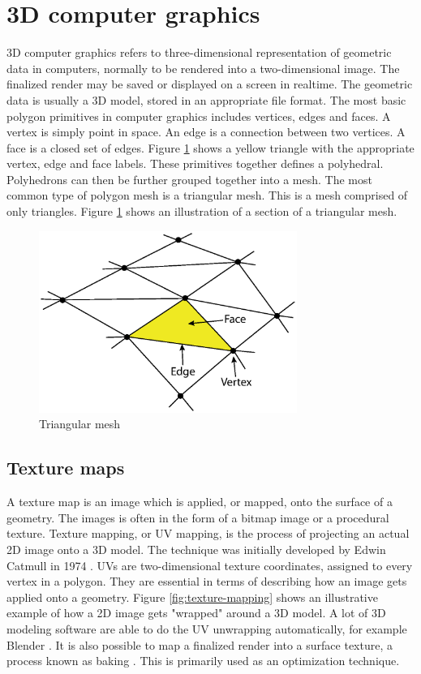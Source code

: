 \section{3D computer graphics}
3D computer graphics refers to three-dimensional representation of geometric data in computers, normally to be rendered into a two-dimensional image. The finalized render may be saved or displayed on a screen in realtime. The geometric data is usually a 3D model, stored in an appropriate file format. The most basic polygon primitives in computer graphics includes vertices, edges and faces. A vertex is simply point in space. An edge is a connection between two vertices. A face is a closed set of edges. Figure \ref{fig:triangular-mesh} shows a yellow triangle with the appropriate vertex, edge and face labels. These primitives together defines a polyhedral. Polyhedrons can then be further grouped together into a mesh. The most common type of polygon mesh is a triangular mesh. This is a mesh comprised of only triangles. Figure \ref{fig:triangular-mesh} shows an illustration of a section of a triangular mesh.
\begin{figure}[ht]
    \centering
    \includegraphics[width=0.75\textwidth]{sections/theory/figures/mesh.eps}
    \caption{Triangular mesh}
    \label{fig:triangular-mesh}
\end{figure}

\subsection{Texture maps}
\label{sec:info-texture-maps}
A texture map is an image which is applied, or mapped, onto the surface of a geometry. The images is often in the form of a bitmap image or a procedural texture. Texture mapping, or UV mapping, is the process of projecting an actual 2D image onto a 3D model. The technique was initially developed by Edwin Catmull in 1974 \cite{catmull-texture-mapping}. UVs are two-dimensional texture coordinates, assigned to every vertex in a polygon. They are essential in terms of describing how an image gets applied onto a geometry. Figure \ref{fig:texture-mapping} shows an illustrative example of how a 2D image gets "wrapped" around a 3D model. A lot of 3D modeling software are able to do the UV unwrapping automatically, for example Blender \cite{blender}. It is also possible to map a finalized render into a surface texture, a process known as baking \cite{blender-texture-baking}. This is primarily used as an optimization technique.

